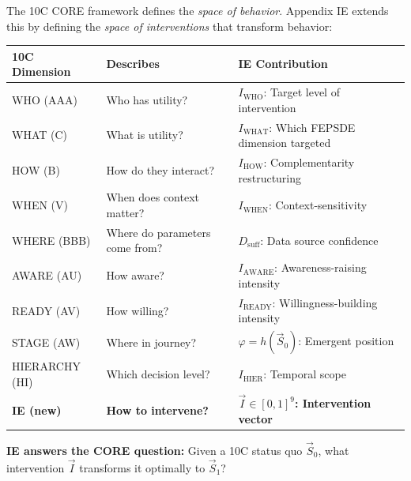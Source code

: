 
\begin{tcolorbox}[colback=red!5!white, colframe=red!75!black,
    title=\textbf{CORE Connection: IE as the 10th CORE Dimension}]

The 10C CORE framework defines the \textit{space of behavior}. Appendix IE extends this by defining the \textit{space of interventions} that transform behavior:

\begin{center}
\renewcommand{\arraystretch}{1.3}
\begin{tabular}{@{}lll@{}}
\toprule
\textbf{10C Dimension} & \textbf{Describes} & \textbf{IE Contribution} \\
\midrule
WHO (AAA) & Who has utility? & $I_{\text{WHO}}$: Target level of intervention \\
WHAT (C) & What is utility? & $I_{\text{WHAT}}$: Which FEPSDE dimension targeted \\
HOW (B) & How do they interact? & $I_{\text{HOW}}$: Complementarity restructuring \\
WHEN (V) & When does context matter? & $I_{\text{WHEN}}$: Context-sensitivity \\
WHERE (BBB) & Where do parameters come from? & $D_{\text{suff}}$: Data source confidence \\
AWARE (AU) & How aware? & $I_{\text{AWARE}}$: Awareness-raising intensity \\
READY (AV) & How willing? & $I_{\text{READY}}$: Willingness-building intensity \\
STAGE (AW) & Where in journey? & $\varphi = h(\vec{S}_0)$: Emergent position \\
HIERARCHY (HI) & Which decision level? & $I_{\text{HIER}}$: Temporal scope \\
\midrule
\textbf{IE (new)} & \textbf{How to intervene?} & \textbf{$\vec{I} \in [0,1]^9$: Intervention vector} \\
\bottomrule
\end{tabular}
\end{center}

\textbf{IE answers the CORE question:} Given a 10C status quo $\vec{S}_0$, what intervention $\vec{I}$ transforms it optimally to $\vec{S}_1$?
\end{tcolorbox}


